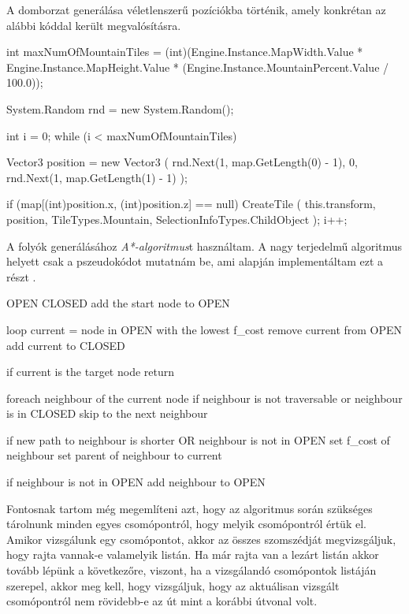 
A domborzat generálása véletlenszerű pozíciókba történik, amely konkrétan az alábbi kóddal került megvalósításra.
\begin{cpp}
int maxNumOfMountainTiles = 
(int)(Engine.Instance.MapWidth.Value * Engine.Instance.MapHeight.Value * 
(Engine.Instance.MountainPercent.Value / 100.0));

System.Random rnd = new System.Random();

int i = 0;
while (i < maxNumOfMountainTiles)
{
   Vector3 position = new Vector3
   (
      rnd.Next(1, map.GetLength(0) - 1),
      0, rnd.Next(1, map.GetLength(1) - 1)
   );

   if (map[(int)position.x, (int)position.z] == null)
   {
      CreateTile
      (
         this.transform, position, TileTypes.Mountain, 
         SelectionInfoTypes.ChildObject
      );
      i++;
   }
}
\end{cpp}


A folyók generálásához \textit{A*-algoritmus}t használtam. A nagy terjedelmű algoritmus helyett csak a pszeudokódot mutatnám be, ami alapján implementáltam ezt a részt \cite{A*Code}.
\begin{cpp}
OPEN 
CLOSED 
add the start node to OPEN

loop
   current = node in OPEN  with the lowest f_cost
   remove current from OPEN
   add current to CLOSED

   if current is the target node
      return

   foreach neighbour of the current node
      if neighbour is not traversable or neighbour is in CLOSED
         skip to the next neighbour

      if new path to neighbour is shorter OR neighbour is not in OPEN
         set f_cost of neighbour
         set parent of neighbour to current
         
         if neighbour is not in OPEN
            add neighbour to OPEN
\end{cpp}

Fontosnak tartom még megemlíteni azt, hogy az algoritmus során szükséges tárolnunk minden egyes csomópontról, hogy melyik csomópontról értük el. Amikor vizsgálunk egy csomópontot, akkor az összes szomszédját megvizsgáljuk, hogy rajta vannak-e valamelyik listán. Ha már rajta van a lezárt listán akkor tovább lépünk a következőre, viszont, ha a vizsgálandó csomópontok listáján szerepel, akkor meg kell, hogy vizsgáljuk, hogy az aktuálisan vizsgált csomópontról nem rövidebb-e az út mint a korábbi útvonal volt.

